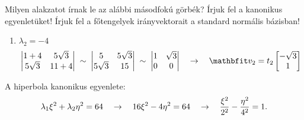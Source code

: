 \begin{exercise}{%
    Milyen alakzatot írnak le az alábbi másodfokú görbék?
    Írjuk fel a kanonikus egyenletüket!
    Írjuk fel a főtengelyek irányvektorait a standard normális bázisban!
  }
{\begin{enumerate}[a)]
\begin{enumerate}[1)]
                    \[
                      \begin{vmatrix}
                        1 - 16     & 5 \sqrt{3} \\
                        5 \sqrt{3} & 11 - 16
                      \end{vmatrix} \;\sim\; \begin{vmatrix}
                        -15        & 5 \sqrt{3} \\
                        5 \sqrt{3} & -5
                      \end{vmatrix} \;\sim\; \begin{vmatrix}
                        -\sqrt{3} & 1 \\
                        0         & 0
                      \end{vmatrix}
                      \quad \rightarrow \quad
                      \rvec v_1 = t_1 \begin{bmatrix}
                        1 \\ \sqrt{3}
                      \end{bmatrix}
                    \]
              \item $\lambda_2 = -4$
                    \[
                      \begin{vmatrix}
                        1 + 4      & 5 \sqrt{3} \\
                        5 \sqrt{3} & 11 + 4
                      \end{vmatrix} \;\sim\; \begin{vmatrix}
                        5          & 5 \sqrt{3} \\
                        5 \sqrt{3} & 15
                      \end{vmatrix} \;\sim\; \begin{vmatrix}
                        1 & \sqrt{3} \\
                        0 & 0
                      \end{vmatrix}
                      \quad \rightarrow \quad
                      \rvec v_2 = t_2 \begin{bmatrix}
                        -\sqrt{3} \\ 1
                      \end{bmatrix}
                    \]
            \end{enumerate}

            A hiperbola kanonikus egyenlete:
            \[
              \lambda_1 \xi^2 + \lambda_2 \eta^2 = 64
              \quad \rightarrow \quad
              16 \xi^2 - 4 \eta^2 = 64
              \quad \rightarrow \quad
              \frac{\xi^2}{2^2} - \frac{\eta^2}{4^2} = 1
              \text.
            \]


\end{enumerate}}
\end{exercise}
